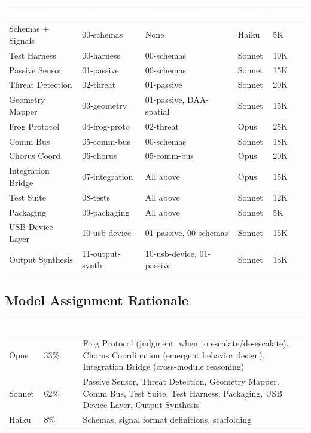 \documentclass[11pt,letterpaper]{article}
\newcommand{\tableheader}[1]{\textbf{\sffamily\textcolor{white}{#1}}}
\begin{document}
\begin{center}
\begin{tabularx}{\textwidth}{L{3cm}L{1.8cm}L{2.5cm}C{1.3cm}C{1.3cm}}
\toprule
{}
\tableheader{Component} & \tableheader{Spec} & \tableheader{Dependencies} & \tableheader{Model} & \tableheader{Tokens} \\
\midrule
Schemas + Signals & 00-schemas & None & Haiku & 5K \\
Test Harness & 00-harness & 00-schemas & Sonnet & 10K \\
Passive Sensor & 01-passive & 00-schemas & Sonnet & 15K \\
Threat Detection & 02-threat & 01-passive & Sonnet & 20K \\
Geometry Mapper & 03-geometry & 01-passive, DAA-spatial & Sonnet & 15K \\
Frog Protocol & 04-frog-proto & 02-threat & Opus & 25K \\
Comm Bus & 05-comm-bus & 00-schemas & Sonnet & 18K \\
Chorus Coord & 06-chorus & 05-comm-bus & Opus & 20K \\
Integration Bridge & 07-integration & All above & Opus & 15K \\
Test Suite & 08-tests & All above & Sonnet & 12K \\
Packaging & 09-packaging & All above & Sonnet & 5K \\
USB Device Layer & 10-usb-device & 01-passive, 00-schemas & Sonnet & 15K \\
Output Synthesis & 11-output-synth & 10-usb-device, 01-passive & Sonnet & 18K \\
\bottomrule
\end{tabularx}
\end{center}

\subsection{Model Assignment Rationale}

\begin{center}
\begin{tabularx}{\textwidth}{C{1.5cm}C{1.5cm}X}
\toprule
{}
\tableheader{Model} & \tableheader{Budget} & \tableheader{Assigned To} \\
\midrule
Opus & 33\% & Frog Protocol (judgment: when to escalate/de-escalate), Chorus Coordination (emergent behavior design), Integration Bridge (cross-module reasoning) \\
Sonnet & 62\% & Passive Sensor, Threat Detection, Geometry Mapper, Comm Bus, Test Suite, Test Harness, Packaging, USB Device Layer, Output Synthesis \\
Haiku & 8\% & Schemas, signal format definitions, scaffolding \\
\bottomrule
\end{tabularx}
\end{center}
\end{document}
